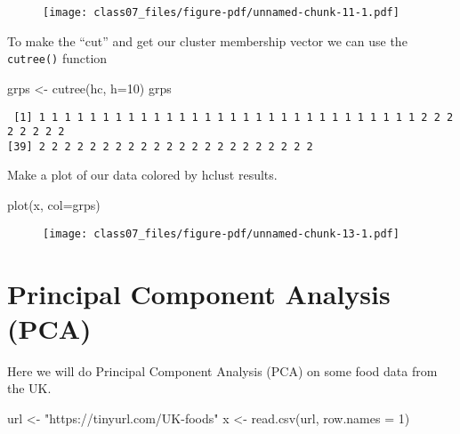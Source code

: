 \documentclass[
  letterpaper,
  DIV=11,
  numbers=noendperiod]{scrartcl}
\newenvironment{Shaded}{\begin{snugshade}}{\end{snugshade}}
\newcommand{\AttributeTok}[1]{\textcolor[rgb]{0.40,0.45,0.13}{#1}}
\newcommand{\DecValTok}[1]{\textcolor[rgb]{0.68,0.00,0.00}{#1}}
\newcommand{\FunctionTok}[1]{\textcolor[rgb]{0.28,0.35,0.67}{#1}}
\newcommand{\NormalTok}[1]{\textcolor[rgb]{0.00,0.23,0.31}{#1}}
\newcommand{\OtherTok}[1]{\textcolor[rgb]{0.00,0.23,0.31}{#1}}
\newcommand{\StringTok}[1]{\textcolor[rgb]{0.13,0.47,0.30}{#1}}
\begin{document}
\begin{figure}[H]

{\centering \texttt{[image: class07\_files/figure-pdf/unnamed-chunk-11-1.pdf]}

}

\end{figure}

To make the ``cut'' and get our cluster membership vector we can use the
\texttt{cutree()} function

\begin{Shaded}
\begin{Highlighting}[]
\NormalTok{grps }\OtherTok{\textless{}{-}} \FunctionTok{cutree}\NormalTok{(hc, }\AttributeTok{h=}\DecValTok{10}\NormalTok{)}
\NormalTok{grps}
\end{Highlighting}
\end{Shaded}

\begin{verbatim}
 [1] 1 1 1 1 1 1 1 1 1 1 1 1 1 1 1 1 1 1 1 1 1 1 1 1 1 1 1 1 1 1 2 2 2 2 2 2 2 2
[39] 2 2 2 2 2 2 2 2 2 2 2 2 2 2 2 2 2 2 2 2 2 2
\end{verbatim}

Make a plot of our data colored by hclust results.

\begin{Shaded}
\begin{Highlighting}[]
\FunctionTok{plot}\NormalTok{(x, }\AttributeTok{col=}\NormalTok{grps)}
\end{Highlighting}
\end{Shaded}

\begin{figure}[H]

{\centering \texttt{[image: class07\_files/figure-pdf/unnamed-chunk-13-1.pdf]}

}

\end{figure}

\hypertarget{principal-component-analysis-pca}{%
\section{Principal Component Analysis
(PCA)}\label{principal-component-analysis-pca}}

Here we will do Principal Component Analysis (PCA) on some food data
from the UK.

\begin{Shaded}
\begin{Highlighting}[]
\NormalTok{url }\OtherTok{\textless{}{-}} \StringTok{"https://tinyurl.com/UK{-}foods"}
\NormalTok{x }\OtherTok{\textless{}{-}} \FunctionTok{read.csv}\NormalTok{(url, }\AttributeTok{row.names =} \DecValTok{1}\NormalTok{)}
\end{Highlighting}
\end{Shaded}
\end{document}
